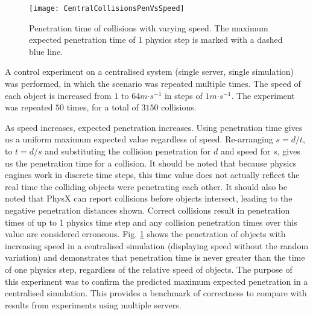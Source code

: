 
\begin{figure}[t]
	\centering
	\texttt{[image: CentralCollisionsPenVsSpeed]}
	\caption{Penetration time of collisions with varying speed. The maximum expected penetration time of 1 physics step is marked with a dashed blue line.}
	\label{fig_ErrorControlTime}
\end{figure}

A control experiment on a centralised system (single server, single simulation) was performed, in which the scenario was repeated multiple times. The speed of each object is increased from $1$ to $64m\mathord{\cdot}s^{-1}$ in steps of $1m\mathord{\cdot}s^{-1}$. The experiment was repeated $50$ times, for a total of $3150$ collisions. %

As speed increases, expected penetration increases. Using penetration time gives us a uniform maximum expected value regardless of speed.
Re-arranging $s=d/t$, to $t=d/s$ and substituting the collision penetration for $d$ and speed for $s$, gives us the penetration time for a collision. It should be noted that because physics engines work in discrete time steps, this time value does not actually reflect the real time the colliding objects were penetrating each other. It should also be noted that PhysX can report collisions before objects intersect, leading to the negative penetration distances shown. Correct collisions result in penetration times of up to 1 physics time step and any collision penetration times over this value are considered erroneous. Fig. \ref{fig_ErrorControlTime} shows the penetration of objects with increasing speed in a centralised simulation (displaying speed without the random variation) and demonstrates that penetration time is never greater than the time of one physics step, regardless of the relative speed of objects. The purpose of this experiment was to confirm the predicted maximum expected penetration in a centralised simulation. This provides a benchmark of correctness to compare with results from experiments using multiple servers.

